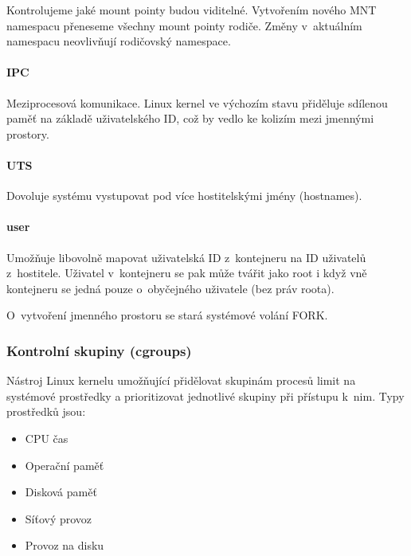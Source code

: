 Kontrolujeme jaké mount pointy budou viditelné.
Vytvořením nového MNT namespacu přeneseme všechny mount pointy rodiče.
Změny v~aktuálním namespacu neovlivňují rodičovský namespace. 


\paragraph{IPC}

Meziprocesová komunikace.
Linux kernel ve výchozím stavu přiděluje sdílenou paměť na základě uživatelského ID, což by vedlo ke kolizím mezi jmennými prostory.


\paragraph{UTS}

Dovoluje systému vystupovat pod více hostitelskými jmény (hostnames).

\paragraph{user}

Umožňuje libovolně mapovat uživatelská ID z~kontejneru na ID uživatelů z~hostitele.
Uživatel v~kontejneru se pak může tvářit jako root i když vně kontejneru se jedná pouze o~obyčejného uživatele (bez práv roota).


O~vytvoření jmenného prostoru se stará systémové volání FORK.

\subsubsection{Kontrolní skupiny (cgroups)}

Nástroj Linux kernelu umožňující přidělovat skupinám procesů limit na systémové prostředky a prioritizovat jednotlivé skupiny při přístupu k~nim.
Typy prostředků jsou:
\begin{itemize}
	\item CPU čas
	\item Operační paměť
	\item Disková paměť %
	\item Síťový provoz
	\item Provoz na disku
\end{itemize}

